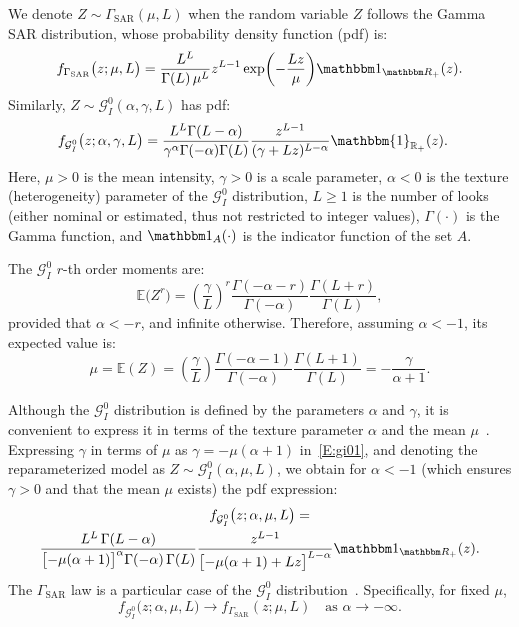 \documentclass[
  lettersize  journal,
]{IEEEtran}%
\begin{document}
We denote \(Z \sim \Gamma_{\mathrm{SAR}}(\mu,L)\) when the random
variable \(Z\) follows the Gamma SAR distribution, whose probability
density function (pdf) is: \begin{equation}
f_{\Gamma_{\mathrm{SAR}}}\bigl(z;\mu, L\bigr) 
= \frac{L^L}{\Gamma(L)\,\mu^L} z^{L-1} 
\exp \biggl(-\frac{Lz}{\mu}\biggr)
\mathbbm 1_{\mathbbm R_+}(z). \label{E:gamma1}
\end{equation} Similarly, \(Z \sim \mathcal{G}^0_I(\alpha,\gamma,L)\)
has pdf: \begin{align}
f_{\mathcal{G}^0_I}\bigl(z;  \alpha,\gamma, L \bigr) &=\frac{L^L\Gamma(L-\alpha)}{\gamma^{\alpha}\Gamma(-\alpha)\Gamma(L)}\frac{z^{L-1}}{(\gamma+Lz)^{L-\alpha}} \mathbbm{1}_{\mathbb{R}_+}(z). \label{E:gi01}
\end{align} Here, \(\mu > 0\) is the mean intensity, \(\gamma > 0\) is a
scale parameter, \(\alpha < 0\) is the texture (heterogeneity) parameter
of the \(\mathcal{G}^0_I\) distribution, \(L \geq 1\) is the number of
looks (either nominal or estimated, thus not restricted to integer
values), \(\Gamma(\cdot)\) is the Gamma function, and
\(\mathbbm 1_{A}(\cdot)\) is the indicator function of the set \(A\).

The \(\mathcal{G}_I^0\) \(r\)-th order moments are: \begin{equation}
\mathbb{E}\big(Z^r\big) = \left(\frac{\gamma}{L}\right)^r\frac{\Gamma(-\alpha-r)}{\Gamma(-\alpha)}\frac{\Gamma(L+r)}{\Gamma(L)}, 
\label{E:rmom}
\end{equation} provided that \(\alpha <-r\), and infinite otherwise.
Therefore, assuming \(\alpha<-1\), its expected value is:
\begin{equation}
\mu=\mathbb{E}(Z)=\left(\frac{\gamma}{L}\right)\frac{\Gamma(-\alpha-1)}{\Gamma(-\alpha)}\frac{\Gamma(L+1)}{\Gamma(L)}=-\frac{\gamma}{\alpha+1}.
\label{E:mean1}
\end{equation}

Although the \(\mathcal{G}^0_I\) distribution is defined by the
parameters \(\alpha\) and \(\gamma\), it is convenient to express it in
terms of the texture parameter \(\alpha\) and the mean
\(\mu\)~. Expressing \(\gamma\)
in terms of \(\mu\) as \(\gamma=-\mu(\alpha+1)\) in~\eqref{E:gi01}, and
denoting the reparameterized model as
\(Z \sim \mathcal{G}^0_I(\alpha,\mu,L)\), we obtain for \(\alpha<-1\)
(which ensures \(\gamma>0\) and that the mean \(\mu\) exists) the pdf
expression: \begin{multline}
    f_{\mathcal{G}^0_I}\bigl(z; \alpha, \mu, L \bigr) 
    = \\
    \frac{L^L\,\Gamma(L-\alpha)}{\bigl[-\mu(\alpha+1)\bigr]^{\alpha} \Gamma(-\alpha)\,\Gamma(L)}
    \frac{z^{L-1}}{\bigl[-\mu(\alpha+1)+Lz\bigr]^{L-\alpha}}
    \mathbbm 1_{\mathbbm R_+}(z). \label{E:gi02}
\end{multline} The \(\Gamma_{\mathrm{SAR}}\) law is a particular case of
the \(\mathcal{G}^0_I\) distribution~.
Specifically, for fixed \(\mu\), \[
  f_{\mathcal{G}^0_I}\bigl(z;\alpha,\mu,L\bigr)
  \longrightarrow
  f_{\Gamma_{\mathrm{SAR}}}(z;\mu,L)
  \quad \text{as } \alpha \to -\infty.
\]
\end{document}
